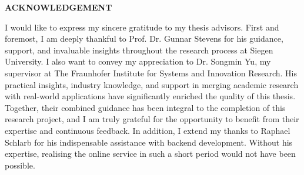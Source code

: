  \setcounter{page}{2}
\begin{center}
    {\Large{\bf{ACKNOWLEDGEMENT}}}
\end{center}

I would like to express my sincere gratitude to my thesis advisors. First and foremost, I am deeply thankful to Prof. Dr. Gunnar Stevens for his guidance, support, and invaluable insights throughout the research process at Siegen University. 
I also want to convey my appreciation to Dr. Songmin Yu, my supervisor at The Fraunhofer Institute for Systems and Innovation Research. His practical insights, industry knowledge, and support in merging academic research with real-world applications have significantly enriched the quality of this thesis.
Together, their combined guidance has been integral to the completion of this research project, and I am truly grateful for the opportunity to benefit from their expertise and continuous feedback. 
In addition, I extend my thanks to Raphael Schlarb for his indispensable assistance with backend development. Without his expertise, realising the online service in such a short period would not have been possible.
\clearpage
